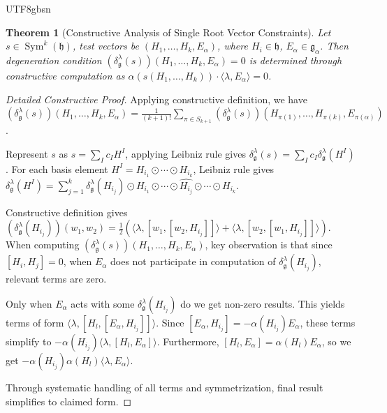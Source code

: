 \documentclass[a4paper,12pt]{extarticle}
\newtheorem{theorem}{Theorem}[section]
\theoremstyle{definition}
\begin{document}
\begin{CJK}{UTF8}{gbsn}
\begin{theorem}[Constructive Analysis of Single Root Vector Constraints]
\label{thm:single_root_constructive_analysis}
Let $s \in \operatorname{Sym}^k(\mathfrak{h})$, test vectors be $(H_1, \ldots, H_k, E_\alpha)$, where $H_i \in \mathfrak{h}$, $E_\alpha \in \mathfrak{g}_\alpha$. Then degeneration condition $(\delta^\lambda_\mathfrak{g}(s))(H_1, \ldots, H_k, E_\alpha) = 0$ is determined through constructive computation as $\alpha(s(H_1, \ldots, H_k)) \cdot \langle \lambda, E_\alpha \rangle = 0$.
\end{theorem}

\begin{proof}[Detailed Constructive Proof]
Applying constructive definition, we have $(\delta^\lambda_\mathfrak{g}(s))(H_1, \ldots, H_k, E_\alpha) = \frac{1}{(k+1)!} \sum_{\pi \in S_{k+1}} (\delta^\lambda_\mathfrak{g}(s))(H_{\pi(1)}, \ldots, H_{\pi(k)}, E_{\pi(\alpha)})$.

Represent $s$ as $s = \sum_{I} c_I H^I$, applying Leibniz rule gives $\delta^\lambda_\mathfrak{g}(s) = \sum_{I} c_I \delta^\lambda_\mathfrak{g}(H^I)$. For each basis element $H^I = H_{i_1} \odot \cdots \odot H_{i_k}$, Leibniz rule gives $\delta^\lambda_\mathfrak{g}(H^I) = \sum_{j=1}^k \delta^\lambda_\mathfrak{g}(H_{i_j}) \odot H_{i_1} \odot \cdots \odot \widehat{H_{i_j}} \odot \cdots \odot H_{i_k}$.

Constructive definition gives $(\delta^\lambda_\mathfrak{g}(H_{i_j}))(w_1, w_2) = \frac{1}{2} \left( \langle \lambda, [w_1, [w_2, H_{i_j}]] \rangle + \langle \lambda, [w_2, [w_1, H_{i_j}]] \rangle \right)$. When computing $(\delta^\lambda_\mathfrak{g}(s))(H_1, \ldots, H_k, E_\alpha)$, key observation is that since $[H_i, H_j] = 0$, when $E_\alpha$ does not participate in computation of $\delta^\lambda_\mathfrak{g}(H_{i_j})$, relevant terms are zero.

Only when $E_\alpha$ acts with some $\delta^\lambda_\mathfrak{g}(H_{i_j})$ do we get non-zero results. This yields terms of form $\langle \lambda, [H_l, [E_\alpha, H_{i_j}]] \rangle$. Since $[E_\alpha, H_{i_j}] = -\alpha(H_{i_j}) E_\alpha$, these terms simplify to $-\alpha(H_{i_j}) \langle \lambda, [H_l, E_\alpha] \rangle$. Furthermore, $[H_l, E_\alpha] = \alpha(H_l) E_\alpha$, so we get $-\alpha(H_{i_j}) \alpha(H_l) \langle \lambda, E_\alpha \rangle$.

Through systematic handling of all terms and symmetrization, final result simplifies to claimed form.
\end{proof}


\end{CJK}
\end{document}
